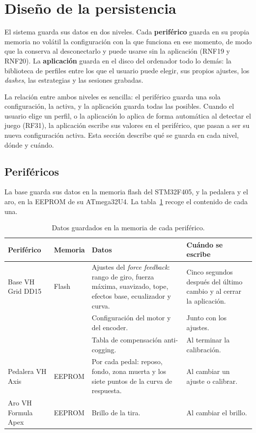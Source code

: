 \section{Diseño de la persistencia}
\label{sec:persistencia}
El sistema guarda sus datos en dos niveles. Cada \textbf{periférico} guarda en su propia memoria no volátil la configuración con la que funciona en ese momento, de modo que la conserva al desconectarlo y puede usarse sin la aplicación (RNF19 y RNF20). La \textbf{aplicación} guarda en el disco del ordenador todo lo demás: la biblioteca de perfiles entre los que el usuario puede elegir, sus propios ajustes, los \textit{dashes}, las estrategias y las sesiones grabadas.

La relación entre ambos niveles es sencilla: el periférico guarda una sola configuración, la activa, y la aplicación guarda todas las posibles. Cuando el usuario elige un perfil, o la aplicación lo aplica de forma automática al detectar el juego (RF31), la aplicación escribe sus valores en el periférico, que pasan a ser su nueva configuración activa. Esta sección describe qué se guarda en cada nivel, dónde y cuándo.

\subsection{Periféricos}
\label{subsec:persistencia-perifericos}
La base guarda sus datos en la memoria flash del STM32F405, y la pedalera y el aro, en la EEPROM de su ATmega32U4. La tabla~\ref{tab:persistencia-perifericos} recoge el contenido de cada una.

\begin{table}[H]
	\centering
	\caption{Datos guardados en la memoria de cada periférico.}
	\label{tab:persistencia-perifericos}
	\small
	\begin{tabularx}{\textwidth}{@{}>{\raggedright\arraybackslash}p{2.4cm}>{\raggedright\arraybackslash}p{1.8cm}X>{\raggedright\arraybackslash}p{3.2cm}@{}}
		\toprule
		\textbf{Periférico} & \textbf{Memoria} & \textbf{Datos} & \textbf{Cuándo se escribe} \\
		\midrule
		Base VH Grid DD15 & Flash & Ajustes del \textit{force feedback}: rango de giro, fuerza máxima, suavizado, tope, efectos base, ecualizador y curva. & Cinco segundos después del último cambio y al cerrar la aplicación. \\
		& & Configuración del motor y del encoder. & Junto con los ajustes. \\
		& & Tabla de compensación anti-cogging. & Al terminar la calibración. \\
		Pedalera VH Axis & EEPROM & Por cada pedal: reposo, fondo, zona muerta y los siete puntos de la curva de respuesta. & Al cambiar un ajuste o calibrar. \\
		Aro VH Formula Apex & EEPROM & Brillo de la tira. & Al cambiar el brillo. \\
		\bottomrule
	\end{tabularx}
\end{table}

